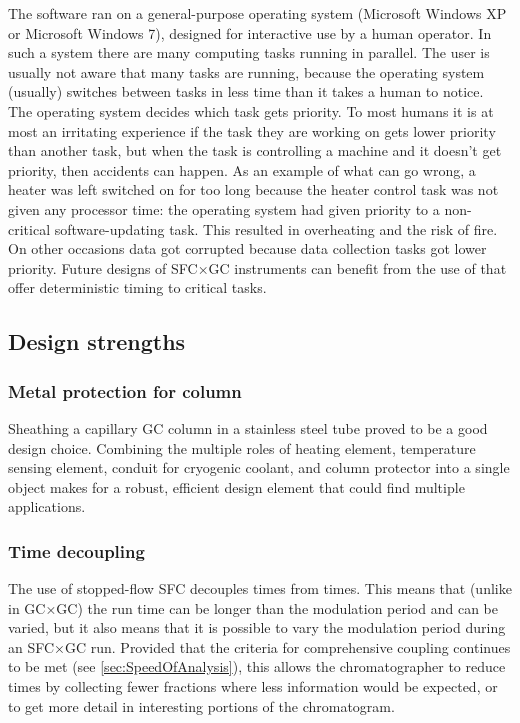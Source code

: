 The software ran on a general-purpose operating system (Microsoft Windows XP or
Microsoft Windows 7), designed for interactive use by a human operator. In such
a system there are many computing tasks running in parallel. The user is usually
not aware that many tasks are running, because the operating system (usually)
switches between tasks in less time than it takes a human to notice. The
operating system decides which task gets priority. To most humans it is at most
an irritating experience if the task they are working on gets lower priority
than another task, but when the task is controlling a machine and it doesn't get
priority, then accidents can happen. As an example of what can go wrong, a
heater was left switched on for too long because the heater control task was not
given any processor time: the operating system had given priority to a
non-critical software-updating task. This resulted in overheating and the risk
of fire. On other occasions data got corrupted because data collection tasks got
lower priority. Future designs of SFC×GC instruments can benefit from the use of
 that offer deterministic timing to
critical tasks.

\subsection{Design strengths}

\subsubsection{Metal protection for column}

Sheathing a capillary GC column in a stainless steel tube proved to be a good
design choice. Combining the multiple roles of heating element, temperature
sensing element, conduit for cryogenic coolant, and column protector into a
single object makes for a robust, efficient design element that could find
multiple applications.

\subsubsection{Time decoupling}

The use of stopped-flow SFC decouples \oneD times from \twoD times. This means
that (unlike in GC×GC) the \twoD run time can be longer than the modulation
period and can be varied, but it also means that it is possible to vary the
modulation period during an SFC×GC run. Provided that the criteria for
comprehensive coupling continues to be met (see \ref{sec:SpeedOfAnalysis}),
this allows the chromatographer to reduce times by collecting fewer fractions
where less information would be expected, or to get more detail in interesting
portions of the \oneD chromatogram.

